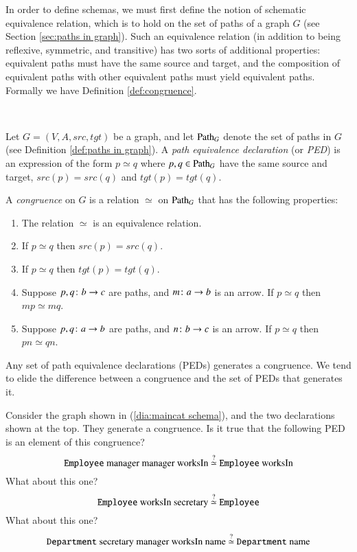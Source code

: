 In order to define schemas, we must first define the notion of schematic equivalence relation, which is to hold on the set of paths of a graph $G$ (see Section \ref{sec:paths in graph}). Such an equivalence relation (in addition to being reflexive, symmetric, and transitive) has two sorts of additional properties: equivalent paths must have the same source and target, and the composition of equivalent paths with other equivalent paths must yield equivalent paths. Formally we have Definition \ref{def:congruence}.

\begin{definition}\label{def:congruence}\

Let $G=(V,A,src,tgt)$ be a graph, and let $\Path_G$ denote the set of paths in $G$ (see Definition \ref{def:paths in graph}). A {\em path equivalence declaration} (or {\em PED}) is an expression of the form $p\simeq q$ where $p,q\in\Path_G$ have the same source and target, $src(p)=src(q)$ and $tgt(p)=tgt(q)$. 

A {\em congruence} on $G$ is a relation $\simeq$ on $\Path_G$ that has the following properties: 
\begin{enumerate}
\item The relation $\simeq$ is an equivalence relation.
\item If $p\simeq q$ then $src(p)=src(q)$.
\item If $p\simeq q$ then $tgt(p)=tgt(q)$.
\item Suppose $p,q\colon b\rightarrow c$ are paths, and $m\colon a\rightarrow b$ is an arrow. If $p\simeq q$ then $mp\simeq mq$. 
\item Suppose $p,q\colon a\rightarrow b$ are paths, and $n\colon b\rightarrow c$ is an arrow. If $p\simeq q$ then $pn\simeq qn$.
\end{enumerate}

\end{definition}

Any set of path equivalence declarations (PEDs) generates a congruence. We tend to elide the difference between a congruence and the set of PEDs that generates it.

\begin{exercise}\label{exc:generating congruence}
Consider the graph shown in (\ref{dia:maincat schema}), and the two declarations shown at the top. They generate a congruence. 
\sexc Is it true that the following PED is an element of this congruence? $$\tn{{\tt Employee} manager manager worksIn $\stackrel{?}{\simeq}$ {\tt Employee} worksIn}$$ \next What about this one? $$\tn{{\tt Employee} worksIn secretary $\stackrel{?}{\simeq}$ {\tt Employee}}$$ 
\next What about this one? $$\tn{{\tt Department} secretary manager worksIn name $\stackrel{?}{\simeq}$ {\tt Department} name}$$
\endsexc
\end{exercise}


